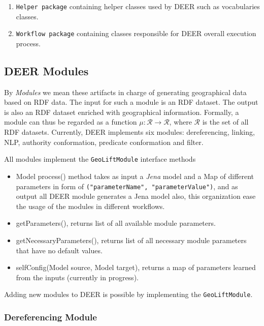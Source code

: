 \documentclass[a4paper,twoside,bibtotoc,abstracton,12pt,BCOR=15mm]{article}
\newcommand{\geolift}{\textsc{DEER}\xspace}
\begin{document}
\begin{enumerate}
  \item \texttt{Helper package} containing helper classes used by \geolift such as vocabularies classes.
  
  \item \texttt{Workflow package} containing classes responsible for \geolift overall execution process.
\end{enumerate}



\subsection{\geolift Modules}
    By \emph{Modules} we mean these artifacts in charge of generating geographical data based on RDF data. 
    The input for such a module is an RDF dataset.
    The output is also an RDF dataset enriched with geographical information.
    Formally, a module can thus be regarded as a function $\mu: \mathcal{R} \rightarrow \mathcal{R}$, where $\mathcal{R}$ is the set of all RDF datasets.
    Currently, \geolift implements six modules: dereferencing, linking, NLP, authority conformation, predicate conformation and filter.

    All modules implement the \texttt{GeoLiftModule} interface methods 
    \begin{itemize}
      \item Model process() method takes as input a \emph{Jena} model and a Map of different parameters in form of \texttt{("parameterName", "parameterValue")},
    and as output all \geolift module generates a Jena model also, this organization ease the usage of the modules in different workflows.
      \item getParameters(), returns list of all available module parameters.
      \item getNecessaryParameters(), returns list of all necessary module parameters that have no default values.
      \item selfConfig(Model source, Model target), returns a map of parameters learned from the inputs (currently in progress).
    \end{itemize}

    Adding new modules to \geolift is possible by implementing the \texttt{GeoLiftModule}.
    \subsubsection{Dereferencing Module}
\end{document}
